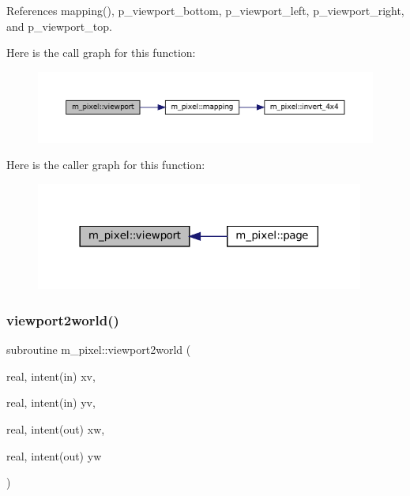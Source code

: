 References mapping(), p\+\_\+viewport\+\_\+bottom, p\+\_\+viewport\+\_\+left, p\+\_\+viewport\+\_\+right, and p\+\_\+viewport\+\_\+top.

Here is the call graph for this function\+:
\nopagebreak
\begin{figure}[H]
\begin{center}
\leavevmode
\includegraphics[width=350pt]{namespacem__pixel_a43247343cd316e3aa075b44b5166e2e9_cgraph}
\end{center}
\end{figure}
Here is the caller graph for this function\+:
\nopagebreak
\begin{figure}[H]
\begin{center}
\leavevmode
\includegraphics[width=306pt]{namespacem__pixel_a43247343cd316e3aa075b44b5166e2e9_icgraph}
\end{center}
\end{figure}
\mbox{\label{namespacem__pixel_a9e23c9a3a5f3b1482986f067fbf8487f}} 
\subsubsection{\texorpdfstring{viewport2world()}{viewport2world()}}
{\footnotesize\ttfamily subroutine m\+\_\+pixel\+::viewport2world (\begin{DoxyParamCaption}\item[{real, intent(in)}]{xv,  }\item[{real, intent(in)}]{yv,  }\item[{real, intent(out)}]{xw,  }\item[{real, intent(out)}]{yw }\end{DoxyParamCaption})\hspace{0.3cm}{\ttfamily [private]}}



